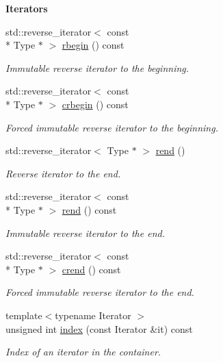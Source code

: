\begin{Indent}{\bf Iterators}
\begin{DoxyCompactItemize}
std\-::reverse\-\_\-iterator$<$ const \\*
Type $\ast$ $>$ \hyperlink{exceptionmagrathea_1_1Evolution_a64ec69f7d731a05ece2be46bb265e175}{rbegin} () const 
\begin{DoxyCompactList}\small\item\em Immutable reverse iterator to the beginning. \end{DoxyCompactList}\item 
std\-::reverse\-\_\-iterator$<$ const \\*
Type $\ast$ $>$ \hyperlink{exceptionmagrathea_1_1Evolution_aa00857398848a07170efd12ce424c681}{crbegin} () const 
\begin{DoxyCompactList}\small\item\em Forced immutable reverse iterator to the beginning. \end{DoxyCompactList}\item 
std\-::reverse\-\_\-iterator$<$ Type $\ast$ $>$ \hyperlink{exceptionmagrathea_1_1Evolution_a65f973f912546090ce6354fe60f211fa}{rend} ()
\begin{DoxyCompactList}\small\item\em Reverse iterator to the end. \end{DoxyCompactList}\item 
std\-::reverse\-\_\-iterator$<$ const \\*
Type $\ast$ $>$ \hyperlink{exceptionmagrathea_1_1Evolution_aa4247d82c236c51a0b415568d676a51e}{rend} () const 
\begin{DoxyCompactList}\small\item\em Immutable reverse iterator to the end. \end{DoxyCompactList}\item 
std\-::reverse\-\_\-iterator$<$ const \\*
Type $\ast$ $>$ \hyperlink{exceptionmagrathea_1_1Evolution_a24a5d43d7493ef2c03941e16a6b7eddf}{crend} () const 
\begin{DoxyCompactList}\small\item\em Forced immutable reverse iterator to the end. \end{DoxyCompactList}\item 
{\footnotesize template$<$typename Iterator $>$ }\\unsigned int \hyperlink{exceptionmagrathea_1_1Evolution_a454765d7d65d539b771015fde7bd60bb}{index} (const Iterator \&it) const 
\begin{DoxyCompactList}\small\item\em Index of an iterator in the container. \end{DoxyCompactList}\end{DoxyCompactItemize}
\end{Indent}
